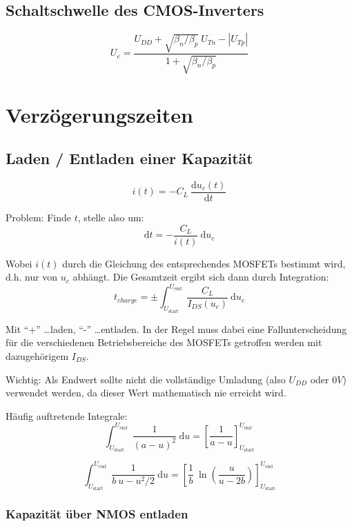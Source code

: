 \documentclass[a4paper,11pt]{article}
\begin{document}
\subsection*{Schaltschwelle des CMOS-Inverters}
\[
	\boxed{ \quad U_e = \frac{U_{DD} + \sqrt{\beta_n / \beta_p} ~ U_{Tn} - |U_{Tp}|}{1 + \sqrt{\beta_n / \beta_p}} \quad }
\]

\section*{Verzögerungszeiten}
\subsection*{Laden / Entladen einer Kapazität}
\[
	i(t) = -C_L ~ \frac{\mathrm du_c(t)}{\mathrm dt}
\]

Problem: Finde $t$, stelle also um:
\[
	\mathrm dt = - \frac{C_L}{i(t)} ~ \mathrm du_c
\]

Wobei $i(t)$ durch die Gleichung des entsprechendes MOSFETs bestimmt wird, d.h. nur von $u_c$ abhängt. Die Gesamtzeit ergibt sich dann durch Integration:
\[
	t_{charge} = \pm \int_{U_{\text{start}}}^{U_{\text{end}}} \frac{C_L}{I_{DS}(u_c)} ~ \mathrm du_c
\]

Mit ``+'' \ldots laden, ``-'' \ldots entladen. In der Regel muss dabei eine Fallunterscheidung für die verschiedenen Betriebsbereiche des MOSFETs getroffen werden mit dazugehörigem $I_{DS}$.

Wichtig: Als Endwert sollte nicht die vollständige Umladung (also $U_{DD}$ oder $0V$) verwendet werden, da dieser Wert mathematisch nie erreicht wird.

Häufig auftretende Integrale:
\[
	\int_{U_{\text{start}}}^{U_{\text{end}}} \frac{1}{(a - u)^2} ~ \mathrm du = \left[ \frac{1}{a - u} \right]_{U_{\text{start}}}^{U_{\text{end}}}
\]

\[
	\int_{U_{\text{start}}}^{U_{\text{end}}} \frac{1}{b ~ u - u^2 / 2} ~ \mathrm du = \left[ \frac{1}{b} ~ \ln \left( \frac{u}{u - 2b} \right) \right]_{U_{\text{start}}}^{U_{\text{end}}}
\]

\subsubsection*{Kapazität über NMOS entladen}
\end{document}

